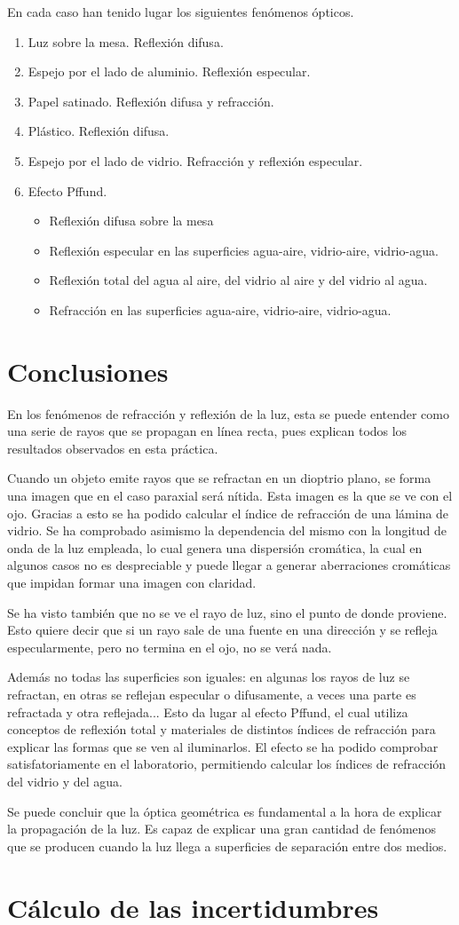 \documentclass[12pt]{article}
\numberwithin{table}{section}
\numberwithin{figure}{section}
\numberwithin{equation}{section}
\begin{document}
En cada caso han tenido lugar los siguientes fenómenos ópticos.
\begin{enumerate}
	\item Luz sobre la mesa. Reflexión difusa.
	\item Espejo por el lado de aluminio. Reflexión especular.
	\item Papel satinado. Reflexión difusa y refracción.
	\item Plástico. Reflexión difusa.
	\item Espejo por el lado de vidrio. Refracción y reflexión especular.
	\item Efecto Pffund.
		\begin{itemize}
			\item Reflexión difusa sobre la mesa
			\item Reflexión especular en las superficies agua-aire, vidrio-aire, vidrio-agua.
			\item Reflexión total del agua al aire, del vidrio al aire y del vidrio al agua.
			\item Refracción en las superficies agua-aire, vidrio-aire, vidrio-agua.
		\end{itemize}
\end{enumerate}

\section{Conclusiones}
En los fenómenos de refracción y reflexión de la luz, esta se puede entender como una serie de rayos que se propagan en línea recta, pues explican todos los resultados observados en esta práctica.

Cuando un objeto emite rayos que se refractan en un dioptrio plano, se forma una imagen que en el caso paraxial será nítida. Esta imagen es la que se ve con el ojo. Gracias a esto se ha podido calcular el índice de refracción de una lámina de vidrio. Se ha comprobado asimismo la dependencia del mismo con la longitud de onda de la luz empleada, lo cual genera una dispersión cromática, la cual en algunos casos no es despreciable y puede llegar a generar aberraciones cromáticas que impidan formar una imagen con claridad.

Se ha visto también que no se ve el rayo de luz, sino el punto de donde proviene. Esto quiere decir que si un rayo sale de una fuente en una dirección y se refleja especularmente, pero no termina en el ojo, no se verá nada.

Además no todas las superficies son iguales: en algunas los rayos de luz se refractan, en otras se reflejan especular o difusamente, a veces una parte es refractada y otra reflejada... Esto da lugar al efecto Pffund, el cual utiliza conceptos de reflexión total y materiales de distintos índices de refracción para explicar las formas que se ven al iluminarlos. El efecto se ha podido comprobar satisfatoriamente en el laboratorio, permitiendo calcular los índices de refracción del vidrio y del agua.

Se puede concluir que la óptica geométrica es fundamental a la hora de explicar la propagación de la luz. Es capaz de explicar una gran cantidad de fenómenos que se producen cuando la luz llega a superficies de separación entre dos medios.

\appendix
\section{Cálculo de las incertidumbres}
\end{document}
